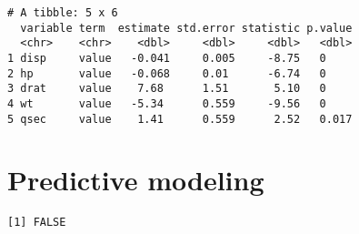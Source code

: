 \documentclass[12pt,letterpaperpaper,openany]{book}
\newenvironment{Shaded}{\begin{snugshade}}{\end{snugshade}}
\newcommand{\CommentTok}[1]{\textcolor[rgb]{0.56,0.35,0.01}{\textit{#1}}}
\newcommand{\DataTypeTok}[1]{\textcolor[rgb]{0.13,0.29,0.53}{#1}}
\newcommand{\DecValTok}[1]{\textcolor[rgb]{0.00,0.00,0.81}{#1}}
\newcommand{\FloatTok}[1]{\textcolor[rgb]{0.00,0.00,0.81}{#1}}
\newcommand{\KeywordTok}[1]{\textcolor[rgb]{0.13,0.29,0.53}{\textbf{#1}}}
\newcommand{\NormalTok}[1]{#1}
\newcommand{\OperatorTok}[1]{\textcolor[rgb]{0.81,0.36,0.00}{\textbf{#1}}}
\newcommand{\StringTok}[1]{\textcolor[rgb]{0.31,0.60,0.02}{#1}}
\begin{document}
\begin{verbatim}
# A tibble: 5 x 6
  variable term  estimate std.error statistic p.value
  <chr>    <chr>    <dbl>     <dbl>     <dbl>   <dbl>
1 disp     value   -0.041     0.005     -8.75   0    
2 hp       value   -0.068     0.01      -6.74   0    
3 drat     value    7.68      1.51       5.10   0    
4 wt       value   -5.34      0.559     -9.56   0    
5 qsec     value    1.41      0.559      2.52   0.017
\end{verbatim}

\hypertarget{predictive-modeling}{%
\chapter{Predictive modeling}\label{predictive-modeling}}

\begin{Shaded}
\end{Shaded}

\begin{verbatim}
[1] FALSE
\end{verbatim}
\end{document}
